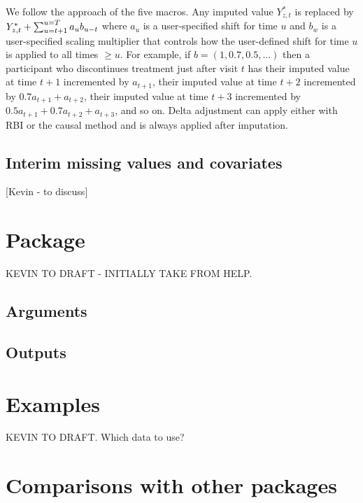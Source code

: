 We follow the approach of the five macros. Any imputed value $Y^*_{z,t}$ is replaced by $Y^*_{z,t} + \sum_{u=t+1}^{u=T} a_u b_{u-t}$ 
where $a_u$ is a user-specified shift for time $u$ and $b_w$ is a user-specified scaling multiplier that controls how the user-defined shift for time $u$ is applied to all times $\ge u$. For example, if $b=(1,0.7, 0.5,...)$ then a participant who discontinues treatment just after visit $t$ has 
their imputed value at time $t+1$ incremented by $a_{t+1}$, 
their imputed value at time $t+2$ incremented by $0.7 a_{t+1} + a_{t+2}$, 
their imputed value at time $t+3$ incremented by $0.5 a_{t+1} +0.7  a_{t+2} + a_{t+3}$, and so on. 
Delta adjustment can apply either with RBI or the causal method and is always applied after imputation.

\subsection{Interim missing values and covariates}

[Kevin - to discuss]


\section{Package}

KEVIN TO DRAFT - INITIALLY TAKE FROM HELP.

\subsection{Arguments}
\subsection{Outputs}


\section{Examples}

KEVIN TO DRAFT. Which data to use?


\section{Comparisons with other packages}


